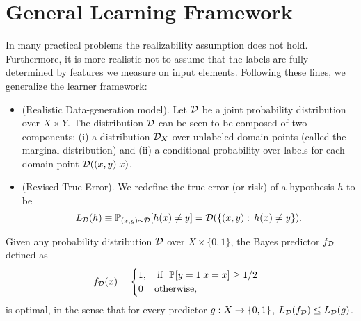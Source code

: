 \documentclass[11pt,a4paper]{article}
\begin{document}
\section{General Learning Framework}

In many practical problems the realizability assumption does not hold. Furthermore, it is more realistic not to assume that the labels are fully determined by features we measure on input elements. Following these lines, we generalize the learner framework:

\begin{itemize}
\item {(Realistic Data-generation model).} Let $\mathcal{D}$ be a joint probability distribution over $X\times Y$. The distribution $\mathcal{D}$ can be seen to be composed of two components: (i) a distribution $\mathcal{D}_X$ over unlabeled domain points (called the marginal distribution) and (ii) a conditional probability over labels for each domain point $\mathcal{D}((x,y)|x)$.

\item {(Revised True Error).} We redefine the true error (or risk) of a hypothesis $h$ to be
\begin{equation*}
L_{\mathcal{D}} (h) \equiv \mathbb{P}_{(x,y)\sim \mathcal{D}}[h(x)\neq y] = \mathcal{D}(\{(x,y):\,h(x)\neq y\}).
\end{equation*}
\end{itemize}

\begin{proposition}
Given any probability distribution $\mathcal{D}$ over $X\times\{0,1\}$, the Bayes predictor $f_{\mathcal{D}}$ defined as
\begin{equation*}
f_{\mathcal{D}}(x) = \begin{cases}
1,\quad \text{if }\ \mathbb{P}[y=1|x = x]\ge 1/2\\
0\,\quad \text{otherwise},
\end{cases}
\end{equation*}
is optimal, in the sense that for every predictor $g:X\rightarrow \{0,1\}$, $L_{\mathcal{D}}(f_{\mathcal{D}})\le L_{\mathcal{D}}(g)$.
\end{proposition}
\end{document}
